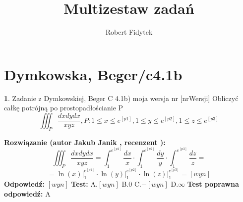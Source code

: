 \documentclass[12pt, a4paper]{article}
\title{Multizestaw zadań}
\author{Robert Fidytek}
\date{}
\theoremstyle{definition} %
\newtheorem{zad}{}
\newcommand{\kategoria}[1]{\section{#1}} %
\newcommand{\zadStart}[1]{\begin{zad}#1\newline} %
\newcommand{\zadStop}{\end{zad}}   %
\newcommand{\rozwStart}[2]{\noindent \textbf{Rozwiązanie (autor #1 , recenzent #2): }\newline} %
\newcommand{\rozwStop}{\newline}                                            %
\newcommand{\odpStart}{\noindent \textbf{Odpowiedź:}\newline}    %
\newcommand{\odpStop}{\newline}                                             %
\newcommand{\testStart}{\noindent \textbf{Test:}\newline} %
\newcommand{\testStop}{\newline} %
\newcommand{\kluczStart}{\noindent \textbf{Test poprawna odpowiedź:}\newline} %
\newcommand{\kluczStop}{\newline} %
\begin{document}
\maketitle


\kategoria{Dymkowska, Beger/c4.1b}
\zadStart{Zadanie z Dymkowskiej, Beger C 4.1b) moja wersja nr [nrWersji]}
Obliczyć całkę potrójną po prostopadłościanie P $$\iiint_P \frac{dxdydx}{xyz}, P: 1 \leq x \leq e^{[p1]}, 1 \leq y \leq e^{[p2]}, 1 \leq z \leq e^{[p3]}$$
\zadStop
\rozwStart{Jakub Janik}{}
$$\iiint_P \frac{dxdydx}{xyz}= \int_1^{e^{[p1]}}\frac{dx}{x} \cdot \int_1^{e^{[p2]}}\frac{dy}{y} \cdot \int_1^{e^{[p3]}}\frac{dz}{z}=$$
$$=\ln{(x)} \Big|_1^{e^{[p1]}} \cdot \ln{(y)} \Big|_1^{e^{[p2]}} \cdot \ln{(z)} \Big|_1^{e^{[p3]}}=[wyn]$$
\rozwStop
\odpStart
$[wyn]$
\odpStop
\testStart
A.$[wyn]$
B.$0$
C.$-[wyn]$
D.$\infty$
\testStop
\kluczStart
A
\kluczStop
\end{document}
